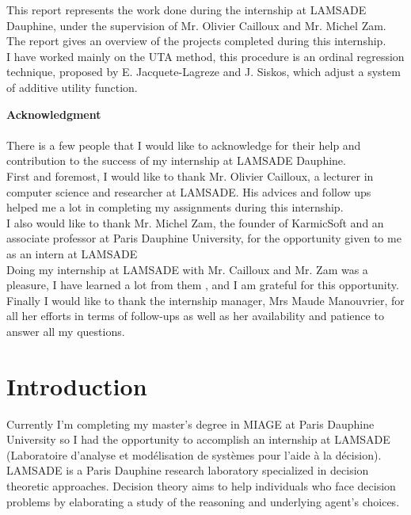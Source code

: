 \documentclass{report}
\begin{document}


\abstract 
This report represents the work done during the internship at LAMSADE Dauphine, under the supervision of Mr. Olivier Cailloux and Mr. Michel Zam. The report gives an overview of the projects completed during this internship.\\
I have worked mainly on the UTA method, this procedure is an ordinal regression technique, proposed by E. Jacquete-Lagreze and J. Siskos, which adjust a system of additive utility function.

\newpage
{ \huge \bfseries Acknowledgment}\\[0.3cm]
\\

There is a few people that I would like to acknowledge for their help and contribution to the success of my internship at LAMSADE Dauphine.\\

First and foremost, I would like to thank Mr. Olivier Cailloux, a lecturer in computer science and researcher at LAMSADE. His advices and follow ups helped me a lot in completing my assignments during this internship.\\

I also would like to thank Mr. Michel Zam, the founder of KarmicSoft and an associate professor at Paris Dauphine University, for the opportunity given to me as an intern at LAMSADE\\

Doing my internship at LAMSADE with Mr. Cailloux and Mr. Zam was a pleasure, I have learned a lot from them , and I am grateful for this opportunity.\\

Finally I would like to thank the internship manager, Mrs Maude Manouvrier, for all her efforts in terms of follow-ups as well as her availability and patience to answer all my questions.\\

\newpage
\tableofcontents{}
\newpage
{}

\chapter{Introduction}
Currently I'm completing my master's degree in MIAGE at Paris Dauphine University so I had the opportunity to accomplish an internship at LAMSADE (Laboratoire d'analyse et modélisation de systèmes pour l'aide à la décision). LAMSADE is a Paris Dauphine research laboratory specialized in decision theoretic approaches. Decision theory aims to help individuals who face decision problems by elaborating a study of the reasoning and underlying agent's choices. \\
\end{document}
